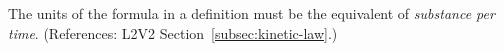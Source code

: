 The units of the  formula in a \KineticLaw definition must be
the equivalent of \emph{substance per time}.  (References: L2V2
Section~\ref{subsec:kinetic-law}.)
